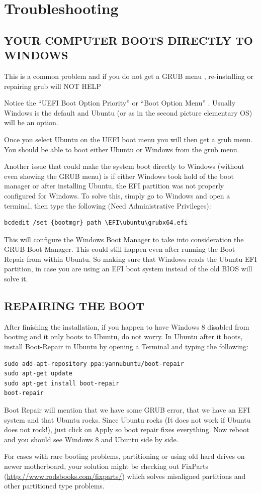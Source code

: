 \documentclass{../guide}
\begin{document}
\section{Troubleshooting}

\subsection{YOUR COMPUTER BOOTS DIRECTLY TO WINDOWS}

This is a common problem and if you do not get a GRUB menu , re-installing or repairing grub will NOT HELP

Notice the ``UEFI Boot Option Priority'' or ``Boot Option Menu'' . Usually Windows is the default and Ubuntu (or as in the second picture elementary OS) will be an option.

Once you select Ubuntu on the UEFI boot menu you will then get a grub menu. You should be able to boot either Ubuntu or Windows from the grub menu.

Another issue that could make the system boot directly to Windows (without even showing the GRUB menu) is if either Windows took hold of the boot manager or after installing Ubuntu, the EFI partition was not properly configured for Windows. To solve this, simply go to Windows and open a terminal, then type the following (Need Administrative Privileges):
\begin{verbatim}
bcdedit /set {bootmgr} path \EFI\ubuntu\grubx64.efi
\end{verbatim}
This will configure the Windows Boot Manager to take into consideration the GRUB Boot Manager. This could still happen even after running the Boot Repair from within Ubuntu. So making sure that Windows reads the Ubuntu EFI partition, in case you are using an EFI boot system instead of the old BIOS will solve it.

\subsection{REPAIRING THE BOOT}
After finishing the installation, if you happen to have Windows 8 disabled from booting and it only boots to Ubuntu, do not worry. In Ubuntu after it boots, install Boot-Repair in Ubuntu by opening a Terminal and typing the following:

\begin{verbatim}
sudo add-apt-repository ppa:yannubuntu/boot-repair
sudo apt-get update
sudo apt-get install boot-repair
boot-repair
\end{verbatim}
Boot Repair will mention that we have some GRUB error, that we have an EFI system and that Ubuntu rocks. Since Ubuntu rocks (It does not work if Ubuntu does not rock!), just click on Apply so boot repair fixes everything. Now reboot and you should see Windows 8 and Ubuntu side by side.

For cases with rare booting problems, partitioning or using old hard drives on newer motherboard, your solution might be checking out FixParts (\url{http://www.rodsbooks.com/fixparts/}) which solves misaligned partitions and other partitioned type problems.
\end{document}
